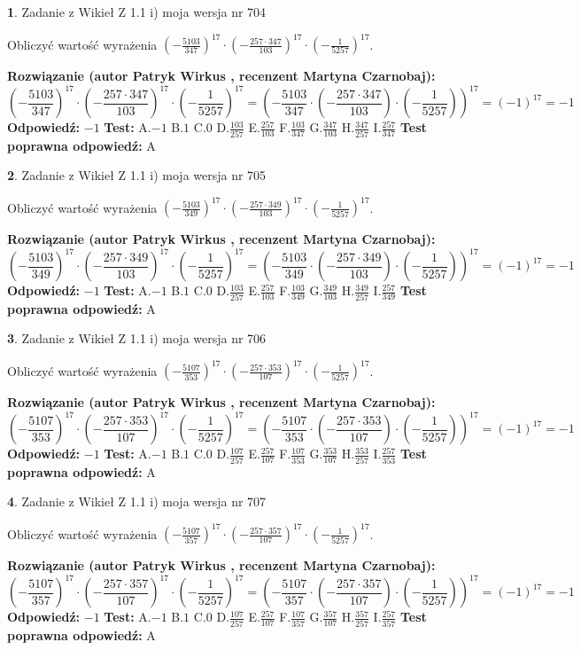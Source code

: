 \documentclass[12pt, a4paper]{article}
\theoremstyle{definition} %
\newtheorem{zad}{}
\newcommand{\zadStart}[1]{\begin{zad}#1\newline}
\newcommand{\zadStop}{\end{zad}}
\newcommand{\rozwStart}[2]{\noindent \textbf{Rozwiązanie (autor #1 , recenzent #2): }\newline}
\newcommand{\rozwStop}{\newline}
\newcommand{\odpStart}{\noindent \textbf{Odpowiedź:}\newline}
\newcommand{\odpStop}{\newline}
\newcommand{\testStart}{\noindent \textbf{Test:}\newline}
\newcommand{\testStop}{\newline}
\newcommand{\kluczStart}{\noindent \textbf{Test poprawna odpowiedź:}\newline}
\newcommand{\kluczStop}{\newline}
\begin{document}
\zadStart{Zadanie z Wikieł Z 1.1 i) moja wersja nr 704}

Obliczyć wartość wyrażenia $(-\frac{5103}{347})^{17} \cdot (-\frac{257 \cdot 347}{103})^{17} \cdot (-\frac{1}{5257})^{17}$.
\zadStop
\rozwStart{Patryk Wirkus}{Martyna Czarnobaj}
$$(-\frac{5103}{347})^{17} \cdot (-\frac{257 \cdot 347}{103})^{17} \cdot (-\frac{1}{5257})^{17} = (-\frac{5103}{347} \cdot (-\frac{257 \cdot 347}{103}) \cdot (-\frac{1}{5257}))^{17} = (-1)^{17} = -1$$
\rozwStop
\odpStart
$-1$
\odpStop
\testStart
A.$-1$ B.$1$ C.$0$ D.$\frac{103}{257}$ E.$\frac{257}{103}$
F.$\frac{103}{347}$ G.$\frac{347}{103}$
H.$\frac{347}{257}$
I.$\frac{257}{347}$
\testStop
\kluczStart
A
\kluczStop



\zadStart{Zadanie z Wikieł Z 1.1 i) moja wersja nr 705}

Obliczyć wartość wyrażenia $(-\frac{5103}{349})^{17} \cdot (-\frac{257 \cdot 349}{103})^{17} \cdot (-\frac{1}{5257})^{17}$.
\zadStop
\rozwStart{Patryk Wirkus}{Martyna Czarnobaj}
$$(-\frac{5103}{349})^{17} \cdot (-\frac{257 \cdot 349}{103})^{17} \cdot (-\frac{1}{5257})^{17} = (-\frac{5103}{349} \cdot (-\frac{257 \cdot 349}{103}) \cdot (-\frac{1}{5257}))^{17} = (-1)^{17} = -1$$
\rozwStop
\odpStart
$-1$
\odpStop
\testStart
A.$-1$ B.$1$ C.$0$ D.$\frac{103}{257}$ E.$\frac{257}{103}$
F.$\frac{103}{349}$ G.$\frac{349}{103}$
H.$\frac{349}{257}$
I.$\frac{257}{349}$
\testStop
\kluczStart
A
\kluczStop



\zadStart{Zadanie z Wikieł Z 1.1 i) moja wersja nr 706}

Obliczyć wartość wyrażenia $(-\frac{5107}{353})^{17} \cdot (-\frac{257 \cdot 353}{107})^{17} \cdot (-\frac{1}{5257})^{17}$.
\zadStop
\rozwStart{Patryk Wirkus}{Martyna Czarnobaj}
$$(-\frac{5107}{353})^{17} \cdot (-\frac{257 \cdot 353}{107})^{17} \cdot (-\frac{1}{5257})^{17} = (-\frac{5107}{353} \cdot (-\frac{257 \cdot 353}{107}) \cdot (-\frac{1}{5257}))^{17} = (-1)^{17} = -1$$
\rozwStop
\odpStart
$-1$
\odpStop
\testStart
A.$-1$ B.$1$ C.$0$ D.$\frac{107}{257}$ E.$\frac{257}{107}$
F.$\frac{107}{353}$ G.$\frac{353}{107}$
H.$\frac{353}{257}$
I.$\frac{257}{353}$
\testStop
\kluczStart
A
\kluczStop



\zadStart{Zadanie z Wikieł Z 1.1 i) moja wersja nr 707}

Obliczyć wartość wyrażenia $(-\frac{5107}{357})^{17} \cdot (-\frac{257 \cdot 357}{107})^{17} \cdot (-\frac{1}{5257})^{17}$.
\zadStop
\rozwStart{Patryk Wirkus}{Martyna Czarnobaj}
$$(-\frac{5107}{357})^{17} \cdot (-\frac{257 \cdot 357}{107})^{17} \cdot (-\frac{1}{5257})^{17} = (-\frac{5107}{357} \cdot (-\frac{257 \cdot 357}{107}) \cdot (-\frac{1}{5257}))^{17} = (-1)^{17} = -1$$
\rozwStop
\odpStart
$-1$
\odpStop
\testStart
A.$-1$ B.$1$ C.$0$ D.$\frac{107}{257}$ E.$\frac{257}{107}$
F.$\frac{107}{357}$ G.$\frac{357}{107}$
H.$\frac{357}{257}$
I.$\frac{257}{357}$
\testStop
\kluczStart
A
\kluczStop
\end{document}
